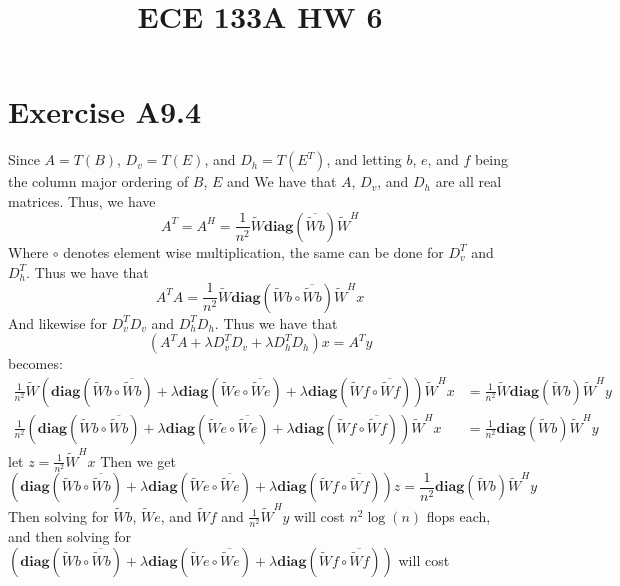 
\title{ECE 133A HW 6}

\maketitle
\section*{Exercise A9.4}
Since $A=T(B)$, $D_v=T(E)$, and $D_h=T(E^T)$, and letting
$b$, $e$, and $f$ being the column major ordering of $B$, $E$ and  
We have that $A$, $D_v$, and $D_h$ are all real matrices.  Thus,
we have
$$A^T=A^H=\frac{1}{n^2}\tilde{W}\textbf{diag}(\overline{\tilde{W}b})\tilde{W}^H$$
Where $\circ$ denotes element wise multiplication, the same can be done for $D_v^T$ and $D_h^T$. Thus we have that
$$A^TA=\frac{1}{n^2}\tilde{W}\textbf{diag}\left(\tilde{W}b\circ\overline{\tilde{W}b}\right)\tilde{W}^Hx$$
And likewise for $D_v^TD_v$ and $D_h^TD_h$. Thus we have that
$$(A^TA+\lambda D^T_vD_v+\lambda D^T_hD_h)x=A^Ty$$
becomes:
\begin{align*}
    \frac{1}{n^2}\tilde{W}\left(\textbf{diag}\left(\tilde{W}b\circ\overline{\tilde{W}b}\right) +\lambda \textbf{diag}\left(\tilde{W}e\circ\overline{\tilde{W}e}\right) 
            +\lambda \textbf{diag}\left(\tilde{W}f\circ\overline{\tilde{W}f}\right)\right)\tilde{W}^Hx
            &=\frac{1}{n^2}\tilde{W}\textbf{diag}(\tilde{W}b)\tilde{W}^Hy\\
            \frac{1}{n^2}\left(\textbf{diag}\left(\tilde{W}b\circ\overline{\tilde{W}b}\right) +\lambda \textbf{diag}\left(\tilde{W}e\circ\overline{\tilde{W}e}\right) 
            +\lambda \textbf{diag}\left(\tilde{W}f\circ\overline{\tilde{W}f}\right)\right)\tilde{W}^Hx
            &=\frac{1}{n^2}\textbf{diag}(\tilde{W}b)\tilde{W}^Hy
\end{align*}
let $z=\frac{1}{n^2}\tilde{W}^Hx$ Then we get
$$\left(\textbf{diag}\left(\tilde{W}b\circ\overline{\tilde{W}b}\right) +\lambda \textbf{diag}\left(\tilde{W}e\circ\overline{\tilde{W}e}\right) 
            +\lambda \textbf{diag}\left(\tilde{W}f\circ\overline{\tilde{W}f}\right)\right)z
            =\frac{1}{n^2}\textbf{diag}(\tilde{W}b)\tilde{W}^Hy$$
Then solving for $\tilde{W}b$, $\tilde{W}e$, and $\tilde{W}f$ and $\frac{1}{n^2}\tilde{W}^Hy$ 
will cost $n^2\log(n)$ flops each, and then solving for 
$\left(\textbf{diag}\left(\tilde{W}b\circ\overline{\tilde{W}b}\right) +\lambda \textbf{diag}\left(\tilde{W}e\circ\overline{\tilde{W}e}\right) 
+\lambda \textbf{diag}\left(\tilde{W}f\circ\overline{\tilde{W}f}\right)\right)$ will cost 
